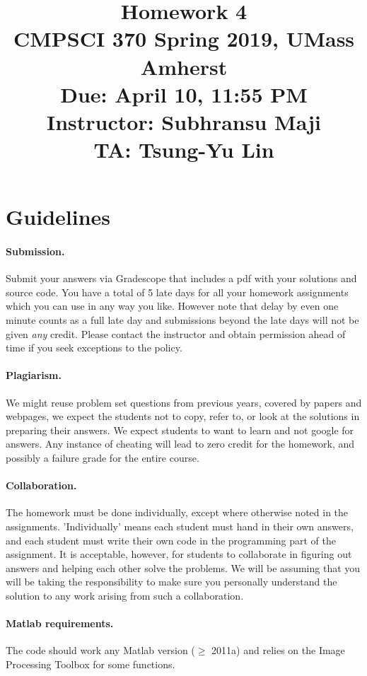 \documentclass[10pt,letterpaper]{article}
\title{
  Homework 4 \\
  \Large{CMPSCI 370 Spring 2019, UMass Amherst} \\
  \Large{Due: April 10, 11:55 PM} \\
  \Large{Instructor: Subhransu Maji} \\
  \Large{TA: Tsung-Yu Lin}
}
\date{}
\begin{document}
\maketitle

\renewcommand\thesubsection{\thesection.\alph{subsection}}


\section*{Guidelines}

\paragraph{Submission.} Submit your answers via Gradescope that includes a pdf with your solutions and source code. You have a total of 5 late days for all your homework assignments which you can use in any way you like. However note that delay by even one minute counts as a full late day and submissions beyond the late days will not be given \emph{any} credit. Please contact the instructor and obtain permission ahead of time if you seek exceptions to the policy.

\paragraph{Plagiarism.} We might reuse problem set questions from previous years, covered by papers and webpages, we expect the students not to copy, refer to, or look at the solutions in preparing their answers. We expect students to want to learn and not google for answers. Any instance of cheating will lead to zero credit for the homework, and possibly a failure grade for the entire course.

\paragraph{Collaboration.} The homework must be done individually, except where otherwise noted in the assignments. 'Individually' means each student must hand in their own answers, and each student must write their own code in the programming part of the assignment. It is acceptable, however, for students to collaborate in figuring out answers and helping each other solve the problems. We will be assuming that you will be taking the responsibility to make sure you personally understand the solution to any work arising from such a collaboration.

\paragraph{Matlab requirements.} The code should work any Matlab version ($\geq$ 2011a) and relies on the Image Processing Toolbox for some functions.
\end{document}
